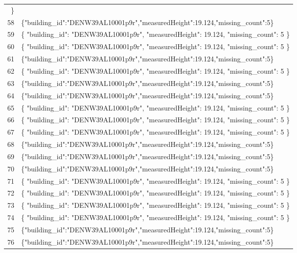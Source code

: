 \documentclass[a4paper,11pt]{article}
\begin{document}
\begin{table}[ht]
\begin{tabular}{r p{12cm}}
\} \\
58 & \{"building\_id":"DENW39AL10001p9r","measuredHeight":19.124,"missing\_count":5\} \\
59 & \{
  "building\_id": "DENW39AL10001p9r",
  "measuredHeight": 19.124,
  "missing\_count": 5
\} \\
60 & \{
  "building\_id": "DENW39AL10001p9r",
  "measuredHeight": 19.124,
  "missing\_count": 5
\} \\
61 & \{"building\_id":"DENW39AL10001p9r","measuredHeight":19.124,"missing\_count":5\} \\
62 & \{
  "building\_id": "DENW39AL10001p9r",
  "measuredHeight": 19.124,
  "missing\_count": 5
\} \\
63 & \{"building\_id":"DENW39AL10001p9r","measuredHeight":19.124,"missing\_count":5\} \\
64 & \{"building\_id":"DENW39AL10001p9r","measuredHeight":19.124,"missing\_count":5\} \\
65 & \{
  "building\_id": "DENW39AL10001p9r",
  "measuredHeight": 19.124,
  "missing\_count": 5
\} \\
66 & \{
  "building\_id": "DENW39AL10001p9r",
  "measuredHeight": 19.124,
  "missing\_count": 5
\} \\
67 & \{
  "building\_id": "DENW39AL10001p9r",
  "measuredHeight": 19.124,
  "missing\_count": 5
\} \\
68 & \{"building\_id":"DENW39AL10001p9r","measuredHeight":19.124,"missing\_count":5\} \\
69 & \{"building\_id":"DENW39AL10001p9r","measuredHeight":19.124,"missing\_count":5\} \\
70 & \{"building\_id":"DENW39AL10001p9r","measuredHeight":19.124,"missing\_count":5\} \\
71 & \{
  "building\_id": "DENW39AL10001p9r",
  "measuredHeight": 19.124,
  "missing\_count": 5
\} \\
72 & \{
  "building\_id": "DENW39AL10001p9r",
  "measuredHeight": 19.124,
  "missing\_count": 5
\} \\
73 & \{
  "building\_id": "DENW39AL10001p9r",
  "measuredHeight": 19.124,
  "missing\_count": 5
\} \\
74 & \{
  "building\_id": "DENW39AL10001p9r",
  "measuredHeight": 19.124,
  "missing\_count": 5
\} \\
75 & \{"building\_id":"DENW39AL10001p9r","measuredHeight":19.124,"missing\_count":5\} \\
76 & \{"building\_id":"DENW39AL10001p9r","measuredHeight":19.124,"missing\_count":5\} \\

\end{tabular}
\end{table}
\end{document}
